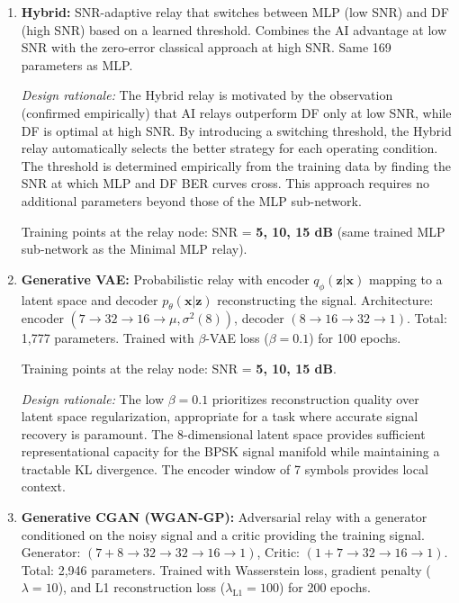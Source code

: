 \begin{enumerate}
Training uses MSE loss with multi-SNR training data (i.e.)  5, 10 and 15 dB), 25,000 samples, and 100 epochs with a learning rate of 0.01.

\item \textbf{Hybrid:} SNR-adaptive relay that switches between MLP (low SNR) and DF (high SNR) based on a learned threshold. Combines the AI advantage at low SNR with the zero-error classical approach at high SNR. Same 169 parameters as MLP.

  \emph{Design rationale:} The Hybrid relay is motivated by the observation (confirmed empirically) that AI relays outperform DF only at low SNR, while DF is optimal at high SNR. By introducing a switching threshold, the Hybrid relay automatically selects the better strategy for each operating condition. The threshold is determined empirically from the training data by finding the SNR at which MLP and DF BER curves cross. This approach requires no additional parameters beyond those of the MLP sub-network.

  Training points at the relay node: SNR = \textbf{5, 10, 15 dB} (same trained MLP sub-network as the Minimal MLP relay).

\item \textbf{Generative VAE:} Probabilistic relay with encoder \(q_\phi(\mathbf{z}|\mathbf{x})\) mapping to a latent space and decoder \(p_\theta(\mathbf{x}|\mathbf{z})\) reconstructing the signal. Architecture: encoder \((7 \to 32 \to 16 \to \mu, \sigma^2(8))\), decoder \((8 \to 16 \to 32 \to 1)\). Total: 1,777 parameters. Trained with \(\beta\)-VAE loss (\(\beta=0.1\)) for 100 epochs.

  Training points at the relay node: SNR = \textbf{5, 10, 15 dB}.

  \emph{Design rationale:} The low \(\beta = 0.1\) prioritizes reconstruction quality over latent space regularization, appropriate for a task where accurate signal recovery is paramount. The 8-dimensional latent space provides sufficient representational capacity for the BPSK signal manifold while maintaining a tractable KL divergence. The encoder window of 7 symbols provides local context.
\item  \textbf{Generative CGAN (WGAN-GP):} Adversarial relay with a generator conditioned on the noisy signal and a critic providing the training signal. Generator: \((7+8 \to 32 \to 32 \to 16 \to 1)\), Critic: \((1+7 \to 32 \to 16 \to 1)\). Total: 2,946 parameters. Trained with Wasserstein loss, gradient penalty (\(\lambda=10\)), and L1 reconstruction loss (\(\lambda_{\text{L1}}=100\)) for 200 epochs.


\end{enumerate}
